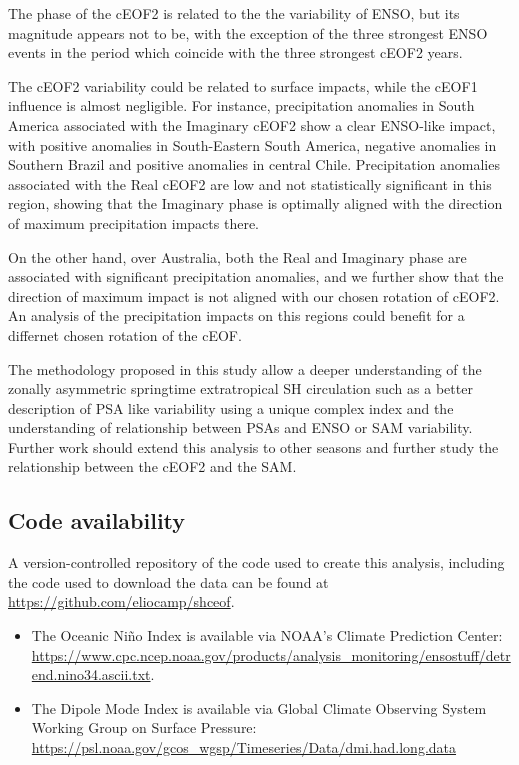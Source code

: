 \documentclass[smallextended]{svjour3}       %
\begin{document}
The phase of the cEOF2 is related to the the variability of ENSO, but its magnitude appears not to be, with the exception of the three strongest ENSO events in the period which coincide with the three strongest cEOF2 years.

The cEOF2 variability could be related to surface impacts, while the cEOF1 influence is almost negligible.
For instance, precipitation anomalies in South America associated with the Imaginary cEOF2 show a clear ENSO-like impact, with positive anomalies in South-Eastern South America, negative anomalies in Southern Brazil and positive anomalies in central Chile.
Precipitation anomalies associated with the Real cEOF2 are low and not statistically significant in this region, showing that the Imaginary phase is optimally aligned with the direction of maximum precipitation impacts there.

On the other hand, over Australia, both the Real and Imaginary phase are associated with significant precipitation anomalies, and we further show that the direction of maximum impact is not aligned with our chosen rotation of cEOF2.
An analysis of the precipitation impacts on this regions could benefit for a differnet chosen rotation of the cEOF.

The methodology proposed in this study allow a deeper understanding of the zonally asymmetric springtime extratropical SH circulation such as a better description of PSA like variability using a unique complex index and the understanding of relationship between PSAs and ENSO or SAM variability.
Further work should extend this analysis to other seasons and further study the relationship between the cEOF2 and the SAM.

\hypertarget{code-availability}{%
\subsection*{Code availability}\label{code-availability}}

A version-controlled repository of the code used to create this analysis, including the code used to download the data can be found at \url{https://github.com/eliocamp/shceof}.

\begin{itemize}
\item
  The Oceanic Niño Index is available via NOAA's Climate Prediction Center: \url{https://www.cpc.ncep.noaa.gov/products/analysis_monitoring/ensostuff/detrend.nino34.ascii.txt}.
\item
  The Dipole Mode Index is available via Global Climate Observing System Working Group on Surface Pressure: \url{https://psl.noaa.gov/gcos_wgsp/Timeseries/Data/dmi.had.long.data}
\end{itemize}
\end{document}
